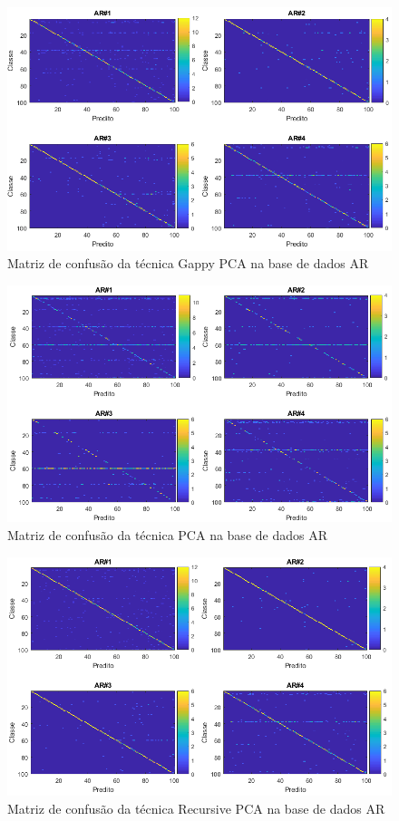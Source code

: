 \begin{figure}[H]
\caption{Matriz de confusão da técnica Gappy PCA na base de dados AR}
\centering
\includegraphics[scale = 0.65]{imgs4/matrizes_confusao/GPCA}
\end{figure}

\begin{figure}[H]
\caption{Matriz de confusão da técnica PCA na base de dados AR}
\centering
\includegraphics[scale = 0.65]{imgs4/matrizes_confusao/PCA}
\end{figure}


\begin{figure}[H]
\caption{Matriz de confusão da técnica Recursive PCA na base de dados AR}
\centering
\includegraphics[scale = 0.65]{imgs4/matrizes_confusao/RecPCA}
\end{figure}


